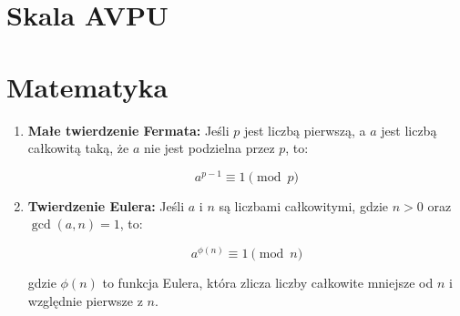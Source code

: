 \documentclass{article}
\begin{document}
\section{Skala AVPU}


\section{Matematyka}
\begin{enumerate}
    \item \textbf{Małe twierdzenie Fermata:} Jeśli \( p \) jest liczbą pierwszą, a \( a \) jest liczbą całkowitą taką, że \( a \) nie jest podzielna przez \( p \), to:

\[
a^{p-1} \equiv 1 \pmod{p}
\]
\item \textbf{Twierdzenie Eulera:} Jeśli \( a \) i \( n \) są liczbami całkowitymi, gdzie \( n > 0 \) oraz \( \gcd(a, n) = 1 \), to:

\[
a^{\phi(n)} \equiv 1 \pmod{n}
\]

gdzie \( \phi(n) \) to funkcja Eulera, która zlicza liczby całkowite mniejsze od \( n \) i względnie pierwsze z \( n \).
\end{enumerate}
\end{document}
